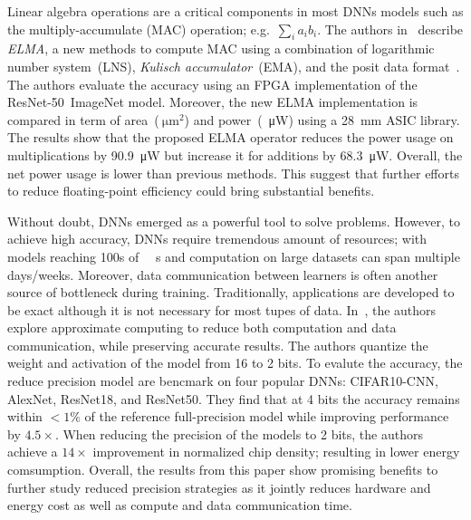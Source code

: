 Linear algebra operations are a critical components in most DNNs models such as 
the multiply-accumulate (MAC) operation; e.g.~$\sum_{i}a_{i}b_{i}$.
The authors in~\cite{Johnson2018-up} describe \textit{ELMA}, a new methods to compute MAC using a combination of logarithmic 
number system~(LNS), \textit{Kulisch accumulator}~(EMA), and the posit data format~\cite{Gustafson2017-wo}.
The authors evaluate the accuracy using an FPGA implementation of the ResNet-50~ImageNet model.
Moreover, the new ELMA implementation is compared in term of area~($\SI{}{\micro\metre}^2$)
and power~(\SI{}{\micro\watt}) using a \SI{28}{\milli\metre} ASIC library.
The results show that the proposed ELMA operator reduces the power usage on 
multiplications by \SI{90.9}{\micro\watt} but increase it for additions by \SI{68.3}{\micro\watt}.
Overall, the net power usage is lower than previous methods.
This suggest that further efforts to reduce floating-point efficiency could bring substantial benefits.

Without doubt, DNNs emerged as a powerful tool to solve problems.
However, to achieve high accuracy, DNNs require tremendous amount of resources;
with models reaching 100s of \SI{}{\mega\byte}s and computation on large datasets can span multiple days/weeks.
Moreover, data communication between learners is often another source of bottleneck during training.
Traditionally, applications are developed to be exact although it is not necessary for most tupes of data.
In~\cite{Chen2018-an}, the authors explore approximate computing to reduce both 
computation and data communication, while preserving accurate results.
The authors quantize the weight and activation of the model from 16 to 2 bits.
To evalute the accuracy, the reduce precision model are bencmark on four popular DNNs: CIFAR10-CNN, AlexNet, ResNet18, and ResNet50.
They find that at 4 bits the accuracy remains within $<1\%$ of the reference 
full-precision model while improving performance by $4.5\times$.
When reducing the precision of the models to 2 bits, the authors achieve a $14\times$
improvement in normalized chip density; resulting in lower energy comsumption.
Overall, the results from this paper show promising benefits to further study reduced 
precision strategies as it jointly reduces hardware and energy cost as well as compute and data communication time.

